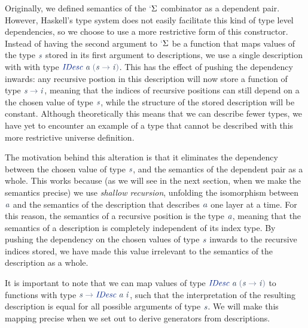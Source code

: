 \documentclass[a4paper,msc,twosized=semi]{uustthesis}
\let\oldemph\emph
\renewcommand\emph[1]{{\large\oldemph{#1}}}
\newcommand*{\mathcolor}{}
\def\mathcolor#1#{\mathcoloraux{#1}}
\newcommand*{\mathcoloraux}[3]{%
  \protect\leavevmode
  \begingroup
    \color#1{#2}#3%
  \endgroup
}
\newcommand{\HSSpecial}[1]{\mathcolor{hsblue4}{#1}}
\newcommand{\HSSym}[1]{\mathcolor{hsblue4}{#1}}
\newcommand{\HSCon}[1]{\mathcolor{hsblue3}{\mathit{#1}}}
\newcommand{\HSVar}[1]{\mathcolor{hsblue5}{\mathit{#1}}}
\begin{document}
  Originally, we defined semantics of the \ensuremath{\HSSpecial{`}\Sigma } combinator as a dependent pair. 
  However, Haskell's type system does not easily facilitate this kind of type level 
  dependencies, so we choose to use a more restrictive form of this constructor. 
  Instead of having the second argument to \ensuremath{\HSSpecial{`}\Sigma } be a function that maps values of 
  the type \ensuremath{\HSVar{s}} stored in its first argument to descriptions, we use a single 
  description with with type \ensuremath{\HSCon{IDesc}\;\HSVar{a}\;\HSSpecial{(}\HSVar{s}\HSSym{\to} \HSVar{i}\HSSpecial{)}}. This has the effect of pushing the 
  dependency inwards: any recursive postion in this description will now store a 
  function of type \ensuremath{\HSVar{s}\HSSym{\to} \HSVar{i}}, meaning that the indices of recursive positions can still 
  depend on a the chosen value of type \ensuremath{\HSVar{s}}, while the structure of the stored 
  description will be constant. Although theoretically this means that we can describe 
  fewer types, we have yet to encounter an example of a type that cannot be described 
  with this more restrictive universe definition. 
  
  The motivation behind this alteration is that it eliminates the dependency between 
  the chosen value of type \ensuremath{\HSVar{s}}, and the semantics of the dependent pair as a whole. 
  This works because (as we will see in the next section, when we make the semantics 
  precise) we use \emph{shallow recursion}, unfolding the isomorphism between \ensuremath{\HSVar{a}} and 
  the semantics of the description that describes \ensuremath{\HSVar{a}} one layer at a time. For this 
  reason, the semantics of a recursive position is the type \ensuremath{\HSVar{a}}, meaning that the 
  semantics of a description is completely independent of its index type. By pushing 
  the dependency on the chosen values of type \ensuremath{\HSVar{s}} inwards to the recursive indices 
  stored, we have made this value irrelevant to the semantics of the description as a 
  whole. 
  
  It is important to note that we can map values of type \ensuremath{\HSCon{IDesc}\;\HSVar{a}\;\HSSpecial{(}\HSVar{s}\HSSym{\to} \HSVar{i}\HSSpecial{)}} to 
  functions with type \ensuremath{\HSVar{s}\HSSym{\to} \HSCon{IDesc}\;\HSVar{a}\;\HSVar{i}}, such that the interpretation of the resulting 
  description is equal for all possible arguments of type \ensuremath{\HSVar{s}}. We will make this 
  mapping precise when we set out to derive generators from descriptions. 
\end{document}
